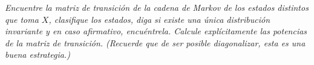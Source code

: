 \emph{
    Encuentre la matriz de transici\'on de la cadena de Markov de los estados distintos que toma $X$, 
    clasifique los estados, diga si existe una \'unica distribuci\'on invariante y en caso afirmativo, 
    encu\'entrela. Calcule expl\'icitamente las potencias de la matriz de transici\'on. 
    (Recuerde que de ser posible diagonalizar, esta es una buena estrategia.)\pn
}

\afterstatement\pn